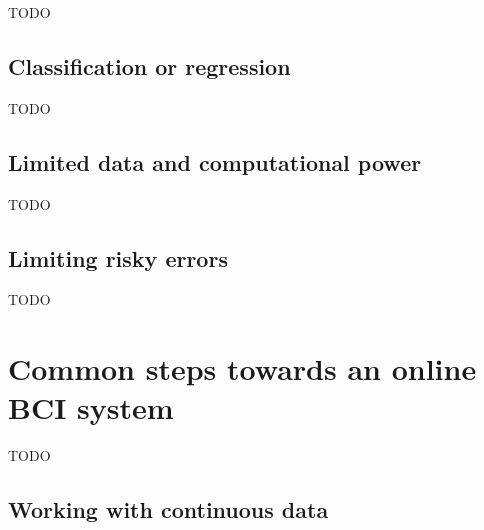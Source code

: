 
TODO


\subsection{Classification or regression}
\label{subsec:online_bci_system_different_goal_classi_vs_reg} 


TODO


\subsection{Limited data and computational power}
\label{subsec:online_bci_system_different_goal_speed} 

TODO


\subsection{Limiting risky errors}
\label{subsec:online_bci_system_different_goal_limit_risk} 

TODO

\section{Common steps towards an online BCI system}
\label{sec:online_bci_system_different_common_steps}

TODO


\subsection{Working with continuous data}
\label{subsec:online_bci_system_different_common_steps_sliding_window} 

